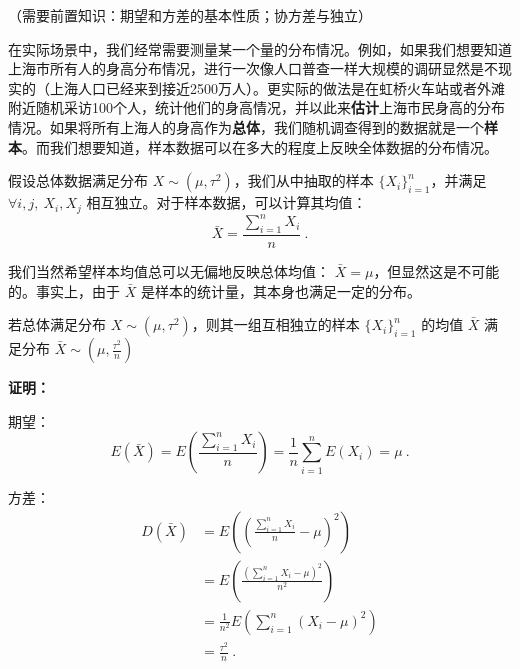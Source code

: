 
\begin{issues}
\issueDraft
\issueMissDepend
\end{issues}
（需要前置知识：期望和方差的基本性质；协方差与独立）

在实际场景中，我们经常需要测量某一个量的分布情况。例如，如果我们想要知道上海市所有人的身高分布情况，进行一次像人口普查一样大规模的调研显然是不现实的（上海人口已经来到接近2500万人）。更实际的做法是在虹桥火车站或者外滩附近随机采访100个人，统计他们的身高情况，并以此来\textbf{估计}上海市民身高的分布情况。如果将所有上海人的身高作为\textbf{总体}，我们随机调查得到的数据就是一个\textbf{样本}。而我们想要知道，样本数据可以在多大的程度上反映全体数据的分布情况。

假设总体数据满足分布 $X\sim(\mu, \tau^2)$，我们从中抽取的样本 $\{X_i \}_{i=1}^n$，并满足 $\forall i,j,\ X_i,X_j$ 相互独立。对于样本数据，可以计算其均值：\begin{equation}
\bar X=\frac{\sum_{i=1}^n X_i}{n}~.
\end{equation}

我们当然希望样本均值总可以无偏地反映总体均值： $\bar X=\mu$，但显然这是不可能的。事实上，由于 $\bar X$ 是样本的统计量，其本身也满足一定的分布。

\begin{theorem}{}
若总体满足分布 $X\sim (\mu, \tau^2)$，则其一组互相独立的样本 $\{X_i \}_{i=1}^n$ 的均值 $\bar X$ 满足分布 $\bar X\sim (\mu, \frac{\tau^2}{n})$
\end{theorem}
\textbf{证明：}

期望：
\begin{equation}
E(\bar X) =E(\frac{\sum_{i=1}^n X_i}{n}) 
        =\frac 1 n \sum_{i=1}^n E(X_i)=\mu~.
\end{equation}

方差：
\begin{equation}
\begin{aligned}
D(\bar X) &=E((\frac{\sum_{i=1}^n X_i}{n}-\mu)^2)\\
&= E(\frac{(\sum_{i=1}^n X_i-\mu)^2}{n^2}) \\
&=\frac {1} {n^2} E(\sum_{i=1}^n (X_i-\mu)^2) \\
&=\frac {\tau^2}{n}~.
\end{aligned}
\end{equation}

